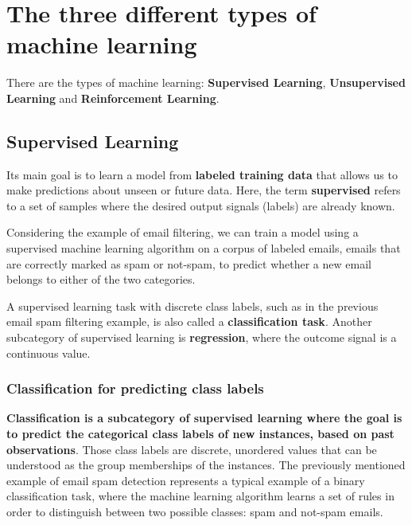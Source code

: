 \documentclass[11pt]{article}
\begin{document}
    \section{The three different types of machine
learning}\label{the-three-different-types-of-machine-learning}

    There are the types of machine learning: \textbf{Supervised Learning},
\textbf{Unsupervised Learning} and \textbf{Reinforcement Learning}.

    

    \subsection{Supervised Learning}\label{supervised-learning}

    Its main goal is to learn a model from \textbf{labeled training data}
that allows us to make predictions about unseen or future data. Here,
the term \textbf{supervised} refers to a set of samples where the
desired output signals (labels) are already known.

    Considering the example of email filtering, we can train a model using a
supervised machine learning algorithm on a corpus of labeled emails,
emails that are correctly marked as spam or not-spam, to predict whether
a new email belongs to either of the two categories.

    A supervised learning task with discrete class labels, such as in the
previous email spam filtering example, is also called a
\textbf{classification task}. Another subcategory of supervised learning
is \textbf{regression}, where the outcome signal is a continuous value.

    

    \subsubsection{Classification for predicting class
labels}\label{classification-for-predicting-class-labels}

    \textbf{Classification is a subcategory of supervised learning where the
goal is to predict the categorical class labels of new instances, based
on past observations}. Those class labels are discrete, unordered values
that can be understood as the group memberships of the instances. The
previously mentioned example of email spam detection represents a
typical example of a binary classification task, where the machine
learning algorithm learns a set of rules in order to distinguish between
two possible classes: spam and not-spam emails.
\end{document}
